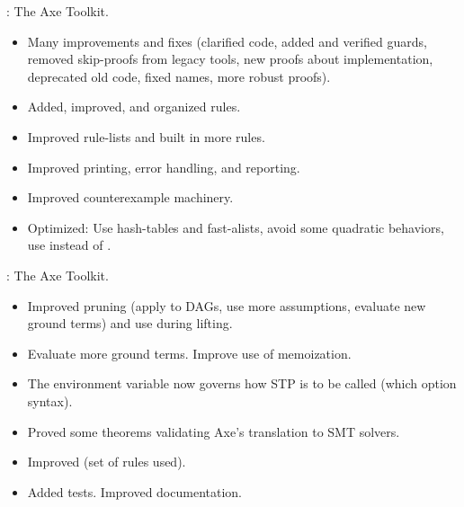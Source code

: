 \begin{frame}

\implibtitle

:
The Axe Toolkit.
\begin{itemize}
\item Many improvements and fixes (clarified code, added and verified guards, removed skip-proofs from legacy tools, new proofs about implementation, deprecated old code, fixed names, more robust proofs).
\item Added, improved, and organized rules.
\item Improved rule-lists and built in more rules.
\item Improved printing, error handling, and reporting.
\item Improved counterexample machinery.
\item Optimized: Use hash-tables and fast-alists, avoid some quadratic behaviors, use  instead of .
\end{itemize}

\end{frame}


\begin{frame}

\implibtitle

:
The Axe Toolkit.
\begin{itemize}
\item Improved pruning (apply to DAGs, use more assumptions, evaluate new ground terms) and use during lifting.
\item Evaluate more ground terms.  Improve use of memoization.
\item The  environment variable now governs how STP is to be called (which option syntax).
\item Proved some theorems validating Axe's translation to SMT solvers.
\item Improved  (set of rules used).
\item Added tests.  Improved documentation.
\end{itemize}

\end{frame}


